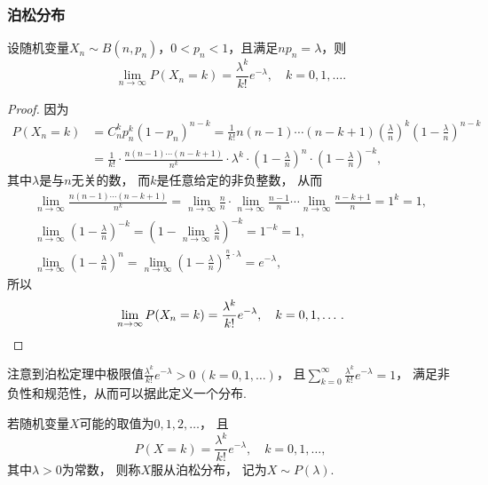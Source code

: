 \subsubsection{泊松分布}
\begin{theorem}[泊松定理]
设随机变量\(X_n \sim B(n,p_n)\)，\(0 < p_n < 1\)，且满足\(n p_n = \lambda\)，则\begin{equation}
	\lim_{n\to\infty} P(X_n=k)
	= \frac{\lambda^k}{k!} e^{-\lambda},
	\quad k=0,1,\dotsc.
\end{equation}
\begin{proof}
因为\begin{align*}
	P(X_n=k) &= C_n^k p_n^k (1-p_n)^{n-k}
	= \frac{1}{k!} n(n-1)\dotsm(n-k+1)
	\left(\frac{\lambda}{n}\right)^k
	\left(1-\frac{\lambda}{n}\right)^{n-k} \\
	&= \frac{1}{k!}
	\cdot \frac{n(n-1)\dotsm(n-k+1)}{n^k}
	\cdot \lambda^k
	\cdot \left(1-\frac{\lambda}{n}\right)^n
	\cdot \left(1-\frac{\lambda}{n}\right)^{-k},
\end{align*}
其中\(\lambda\)是与\(n\)无关的数，
而\(k\)是任意给定的非负整数，
从而\begin{gather*}
	\lim_{n\to\infty} \frac{n(n-1)\dotsm(n-k+1)}{n^k}
	= \lim_{n\to\infty} \frac{n}{n}
	\cdot \lim_{n\to\infty} \frac{n-1}{n}
	\dotsm \lim_{n\to\infty} \frac{n-k+1}{n}
	= 1^k = 1, \\
	\lim_{n\to\infty} \left(1-\frac{\lambda}{n}\right)^{-k}
	= \left(1-\lim_{n\to\infty} \frac{\lambda}{n}\right)^{-k}
	= 1^{-k} = 1, \\
	\lim_{n\to\infty} \left(1-\frac{\lambda}{n}\right)^n
	= \lim_{n\to\infty}
	\left(1-\frac{\lambda}{n}\right)^{\frac{n}{\lambda} \cdot \lambda}
	= e^{-\lambda},
\end{gather*}
所以\[
	\lim_{n\to\infty} P(X_n=k)
	= \frac{\lambda^k}{k!} e^{-\lambda},
	\quad k=0,1,\dotsc.
	\qedhere
\]
\end{proof}
\end{theorem}

注意到泊松定理中极限值\(\frac{\lambda^k}{k!} e^{-\lambda} > 0\ (k=0,1,\dotsc)\)，
且\(\sum_{k=0}^\infty \frac{\lambda^k}{k!} e^{-\lambda} = 1\)，
满足非负性和规范性，从而可以据此定义一个分布.

\begin{definition}
若随机变量\(X\)可能的取值为\(0,1,2,\dotsc\)，
且\begin{equation}\label{equation:随机变量及其分布.泊松分布的分布律}
	P(X=k) = \frac{\lambda^k}{k!} e^{-\lambda},
	\quad k=0,1,\dotsc,
\end{equation}
其中\(\lambda > 0\)为常数，
则称\(X\)服从泊松分布，
记为\(X \sim P(\lambda)\).
\end{definition}

